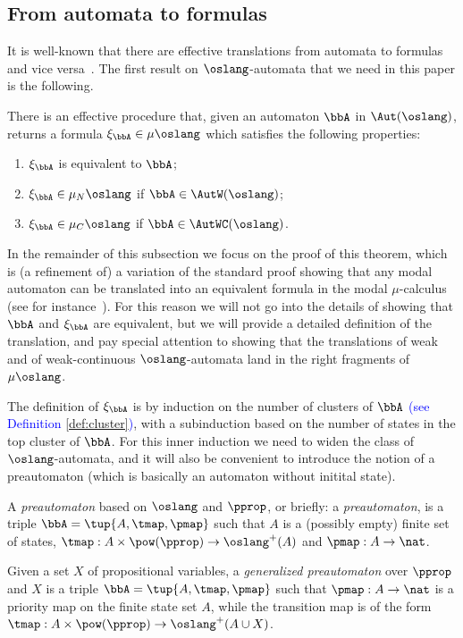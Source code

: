 \subsection{From automata to formulas}
   \label{sec:parity-to-mc}

It is well-known that there are effective translations from automata to formulas
and vice versa~\cite{ALG02}.
The first result on $\oslang$-automata that we need in this paper is the 
following.

\begin{theorem}\label{t:autofor}
There is an effective procedure that, given an automaton $\bbA$ in 
$\Aut(\oslang)$, returns a formula $\xi_{\bbA} \in \mu\oslang$ which satisfies
the following properties:
\begin{enumerate}[(1)]
    
\item $\xi_{\bbA}$ is equivalent to $\bbA$;

\item $\xi_{\bbA} \in \mu_{N}\oslang$ if $\bbA \in \AutW(\oslang)$;

\item $\xi_{\bbA} \in \mu_{C}\oslang$ if $\bbA \in \AutWC(\oslang)$.
\end{enumerate}
\end{theorem}

In the remainder of this subsection
we focus on the proof of this theorem, which is (a refinement of)
a variation of the standard proof showing that any modal automaton can be 
translated into an equivalent formula in the modal $\mu$-calculus (see for
instance~\cite[Section 6]{Ven08}). 
For this reason we will not go into the details of showing that $\bbA$ and 
$\xi_{\bbA}$ are equivalent, but we will provide a detailed definition of the 
translation, and pay special attention to showing that the translations of weak
and of weak-continuous $\oslang$-automata land in the right fragments of 
$\mu\oslang$. 

The definition of $\xi_{\bbA}$ is by induction on the number of clusters  of
$\bbA$ \textcolor{blue}{(see Definition \ref{def:cluster})}, with a subinduction based on the number of states in the top cluster 
of $\bbA$.
For this inner induction we need to widen the class of $\oslang$-automata, and
it will also be convenient to introduce the notion of a preautomaton (which is  
basically an automaton without initital state).

\begin{definition}
A \emph{preautomaton} based on $\oslang$ and $\pprop$, or briefly: a
\emph{preautomaton}, is a triple $\bbA = \tup{A,\tmap,\pmap}$ such that $A$ is
a (possibly empty) finite set of states, $\tmap: A\times \pow(\pprop) \to 
\oslang^+(A)$ and $\pmap: A \to \nat$.

Given a set $X$ of propositional variables, a \emph{generalized preautomaton} 
over $\pprop$ and $X$ is a triple $\bbA = \tup{A,\tmap,\pmap}$ such that $\pmap:
A \to \nat$ is a priority map on the finite state set $A$, while the transition 
map is of the form $\tmap: A\times \pow(\pprop) \to \oslang^+(A\cup X)$.
\end{definition}

